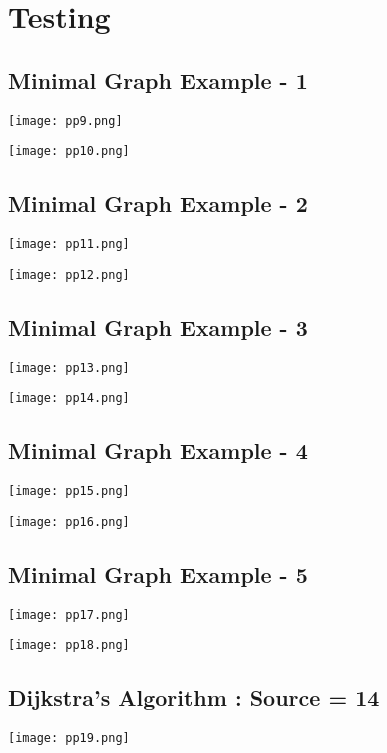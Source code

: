 \documentclass{article}
\begin{document}
\section{Testing}
\subsection{Minimal Graph Example - 1}
\begin{center}
\texttt{[image: pp9.png]}
\end{center}
\begin{center}
\texttt{[image: pp10.png]}
\end{center}
\subsection{Minimal Graph Example - 2}
\begin{center}
\texttt{[image: pp11.png]}
\end{center}
\begin{center}
\texttt{[image: pp12.png]}
\end{center}
\subsection{Minimal Graph Example - 3}
\begin{center}
\texttt{[image: pp13.png]}
\end{center}
\begin{center}
\texttt{[image: pp14.png]}
\end{center}
\subsection{Minimal Graph Example - 4}
\begin{center}
\texttt{[image: pp15.png]}
\end{center}
\begin{center}
\texttt{[image: pp16.png]}
\end{center}
\subsection{Minimal Graph Example - 5}
\begin{center}
\texttt{[image: pp17.png]}
\end{center}
\begin{center}
\texttt{[image: pp18.png]}
\end{center}
\subsection{Dijkstra's Algorithm : Source = 14}
\begin{center}
\texttt{[image: pp19.png]}
\end{center}
\end{document}
